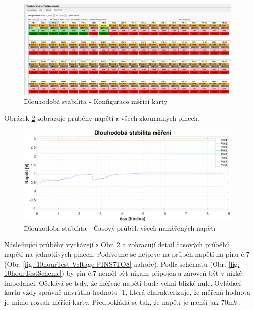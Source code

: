\begin{figure}[ht!]
    \centering
    \includegraphics[width = 1\textwidth]{obrazky/10hourTestConfig.png}
    \caption{Dlouhodobá stabilita - Konfigurace měřící karty}
    \label{fig: 10hourTestConfig}
\end{figure}
\clearpage
Obrázek \ref{fig: 10hourTest ALL} zobrazuje průběhy napětí a všech zkoumaných pinech.
\begin{figure}[ht!]
    \centering
    \includegraphics[width = 1\textwidth]{obrazky/matlab_generated/VOLTAGE_TESTER/dlouhodoba_stabilita_cas_prehled.eps}
    \caption{Dlouhodobá stabilita - Časový průběh všech naměřených napětí}
    \label{fig: 10hourTest ALL}
\end{figure}

Následující průběhy vycházejí z Obr. \ref{fig: 10hourTest ALL} a zobrazují detail časových průběhů napětí na jednotlivých pinech.
Podívejme se nejprve na průběh napětí na pinu č.7 (Obr. \ref{fig: 10hourTest Voltage PINS7TO8} nahoře).
Podle schématu (Obr. \ref{fig: 10hourTestScheme}) by pin č.7 neměl být nikam připojen a zároveň být v nízké impedanci. Očekává se tedy,
že měřené napětí bude velmi blízké nule. Ovládací karta vždy správně navrátila hodnotu -1,
která charakterizuje, že měřená hodnota je mimo rozsah měřící karty. Předpokládá se tak, že napětí je menší jak 70mV.\par

